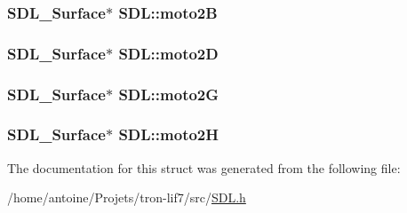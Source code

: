 \hypertarget{structSDL_ab716b277adfd0902fbba7af5e4268c50}{
\subsubsection[{moto2\-B}]{\setlength{\rightskip}{0pt plus 5cm}S\-D\-L\-\_\-\-Surface$\ast$ S\-D\-L\-::moto2\-B}}\label{structSDL_ab716b277adfd0902fbba7af5e4268c50}
\hypertarget{structSDL_a5afda5cf42f55a9be258ee2f0605e95b}{
\subsubsection[{moto2\-D}]{\setlength{\rightskip}{0pt plus 5cm}S\-D\-L\-\_\-\-Surface$\ast$ S\-D\-L\-::moto2\-D}}\label{structSDL_a5afda5cf42f55a9be258ee2f0605e95b}
\hypertarget{structSDL_a2b133fdfed2044880e83945f4582f313}{
\subsubsection[{moto2\-G}]{\setlength{\rightskip}{0pt plus 5cm}S\-D\-L\-\_\-\-Surface$\ast$ S\-D\-L\-::moto2\-G}}\label{structSDL_a2b133fdfed2044880e83945f4582f313}
\hypertarget{structSDL_a8f0410c7a39fd55e7da1ee0e8c351fea}{
\subsubsection[{moto2\-H}]{\setlength{\rightskip}{0pt plus 5cm}S\-D\-L\-\_\-\-Surface$\ast$ S\-D\-L\-::moto2\-H}}\label{structSDL_a8f0410c7a39fd55e7da1ee0e8c351fea}


The documentation for this struct was generated from the following file\-:\begin{DoxyCompactItemize}
\item 
/home/antoine/\-Projets/tron-\/lif7/src/\hyperlink{SDL_8h}{S\-D\-L.\-h}\end{DoxyCompactItemize}
